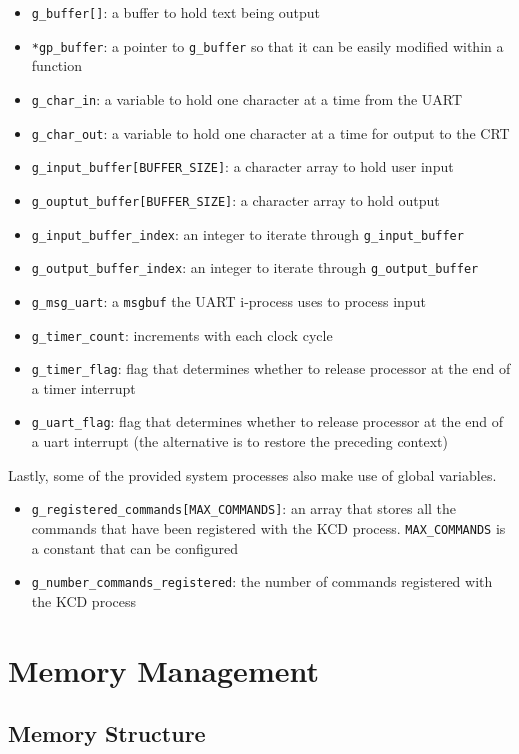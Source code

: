 \documentclass[12pt]{report}
\begin{document}
\begin{itemize}
	\item \texttt{g\_buffer[]}: a buffer to hold text being output
	\item \texttt{*gp\_buffer}: a pointer to \texttt{g\_buffer} so that it can be easily modified within a function
	\item \texttt{g\_char\_in}: a variable to hold one character at a time from the UART
	\item \texttt{g\_char\_out}: a variable to hold one character at a time for output to the CRT
	\item \texttt{g\_input\_buffer[BUFFER\_SIZE]}: a character array to hold user input
	\item \texttt{g\_ouptut\_buffer[BUFFER\_SIZE]}: a character array to hold output
	\item \texttt{g\_input\_buffer\_index}: an integer to iterate through \texttt{g\_input\_buffer}
	\item \texttt{g\_output\_buffer\_index}: an integer to iterate through \texttt{g\_output\_buffer}
	\item \texttt{g\_msg\_uart}: a \texttt{msgbuf} the UART i-process uses to process input
	\item \texttt{g\_timer\_count}: increments with each clock cycle
	\item \texttt{g\_timer\_flag}: flag that determines whether to release processor at the end of a timer interrupt
\item \texttt{g\_uart\_flag}: flag that determines whether to release processor at the end of a uart interrupt (the alternative is to restore the preceding context)
\end{itemize}
Lastly, some of the provided system processes also make use of global variables.
\begin{itemize}
\item \texttt{g\_registered\_commands[MAX\_COMMANDS]}: an array that stores all the commands that have been registered with the KCD process. {\tt MAX\_COMMANDS} is a constant that can be configured
\item \texttt{g\_number\_commands\_registered}: the number of commands registered with the KCD process
\end{itemize}

\section{Memory Management}

\subsection{Memory Structure}
\end{document}
